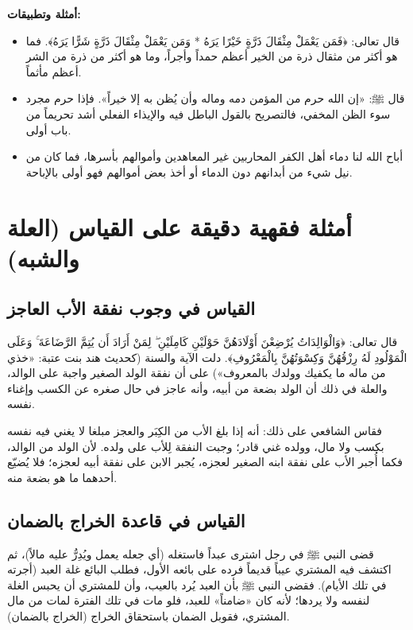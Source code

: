 \textbf{أمثلة وتطبيقات:}
\begin{itemize}
    \item قال تعالى: ﴿فَمَن يَعْمَلْ مِثْقَالَ ذَرَّةٍ خَيْرًا يَرَهُ * وَمَن يَعْمَلْ مِثْقَالَ ذَرَّةٍ شَرًّا يَرَهُ﴾. فما هو أكثر من مثقال ذرة من الخير أعظم حمداً وأجراً، وما هو أكثر من ذرة من الشر أعظم مأثماً.
    \item قال ﷺ: «إن الله حرم من المؤمن دمه وماله وأن يُظن به إلا خيراً». فإذا حرم مجرد سوء الظن المخفي، فالتصريح بالقول الباطل فيه والإيذاء الفعلي أشد تحريماً من باب أولى.
    \item أباح الله لنا دماء أهل الكفر المحاربين غير المعاهدين وأموالهم بأسرها، فما كان من نيل شيء من أبدانهم دون الدماء أو أخذ بعض أموالهم فهو أولى بالإباحة.
\end{itemize}

\section{أمثلة فقهية دقيقة على القياس (العلة والشبه)}

\subsection{القياس في وجوب نفقة الأب العاجز}
قال تعالى: ﴿وَالْوَالِدَاتُ يُرْضِعْنَ أَوْلَادَهُنَّ حَوْلَيْنِ كَامِلَيْنِ ۖ لِمَنْ أَرَادَ أَن يُتِمَّ الرَّضَاعَةَ ۚ وَعَلَى الْمَوْلُودِ لَهُ رِزْقُهُنَّ وَكِسْوَتُهُنَّ بِالْمَعْرُوفِ﴾. 
دلت الآية والسنة (كحديث هند بنت عتبة: «خذي من ماله ما يكفيك وولدك بالمعروف») على أن نفقة الولد الصغير واجبة على الوالد، والعلة في ذلك أن الولد بضعة من أبيه، وأنه عاجز في حال صغره عن الكسب وإغناء نفسه. 

فقاس الشافعي على ذلك: أنه إذا بلغ الأب من الكِبَر والعجز مبلغا لا يغني فيه نفسه بكسب ولا مال، وولده غني قادر؛ وجبت النفقة لِلأب على ولده. لأن الولد من الوالد، فكما أُجبر الأب على نفقة ابنه الصغير لعجزه، يُجبر الابن على نفقة أبيه لعجزه؛ فلا يُضيّع أحدهما ما هو بضعة منه.

\subsection{القياس في قاعدة الخراج بالضمان}
قضى النبي ﷺ في رجل اشترى عبداً فاستغله (أي جعله يعمل ويُدِرُّ عليه مالاً)، ثم اكتشف فيه المشتري عيباً قديماً فرده على بائعه الأول، فطلب البائع غلة العبد (أجرته في تلك الأيام). فقضى النبي ﷺ بأن العبد يُرد بالعيب، وأن للمشتري أن يحبس الغلة لنفسه ولا يردها؛ لأنه كان «ضامناً» للعبد، فلو مات في تلك الفترة لمات من مال المشتري، فقوبل الضمان باستحقاق الخراج (الخراج بالضمان).

